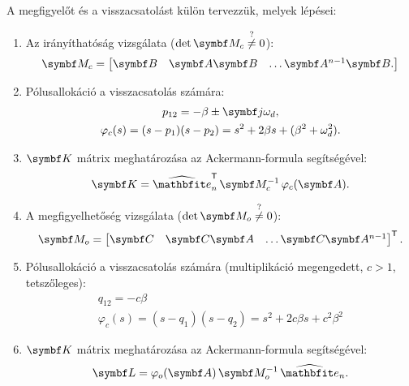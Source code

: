 \bgroup
\samepage
A megfigyelőt és a visszacsatolást külön tervezzük, melyek lépései:
\begin{enumerate}[label={\color{darkRed}\theenumi})]
  \item Az irányíthatóság vizsgálata ($\det \rmat M_c \overset{?}{\neq} 0$):
        \begin{equation}
          \rmat M_c = \begin{bmatrix}
            \rmat B         &
            \rmat A \rmat B &
            \dots
            \rmat A^{n-1} \rmat B
            .
          \end{bmatrix}
        \end{equation}
  \item Pólusallokáció a visszacsatolás számára:
        \begin{gather}
          p_{12}
          = -\beta \pm \iu \omega_d,
          \\
          \varphi_c(s)
          = (s - p_1)(s - p_2)
          = s^2 + 2 \beta s + (\beta^2 + \omega_d^2).
        \end{gather}
  \item $\rmat K$ mátrix meghatározása az Ackermann-formula segítségével:
        \begin{equation}
          \rmat K
          = \uvec e_n^\T
          \,\rmat M_c^{-1}
          \,\varphi_c(\rmat A)
          .
        \end{equation}
  \item A megfigyelhetőség vizsgálata ($\det \rmat M_o \overset{?}{\neq} 0$):
        \begin{equation}
          \rmat M_o = \begin{bmatrix}
            \rmat C         &
            \rmat C \rmat A &
            \dots
            \rmat C \rmat A^{n-1}
          \end{bmatrix}^\T
          .
        \end{equation}
  \item Pólusallokáció a visszacsatolás számára
        (multiplikáció megengedett, $c > 1$, tetszőleges):
        \begin{gather}
          q_{12}
          = -c \beta
          \\
          \varphi_c(s)
          = (s - q_1)(s - q_2)
          = s^2 + 2c \beta s + c^2 \beta^2
        \end{gather}
  \item $\rmat K$ mátrix meghatározása az Ackermann-formula segítségével:
        \begin{equation}
          \rmat L
          = \varphi_o(\rmat A)
          \,\rmat M_o^{-1}
          \,\uvec e_n
          .
        \end{equation}
\end{enumerate}
\egroup


